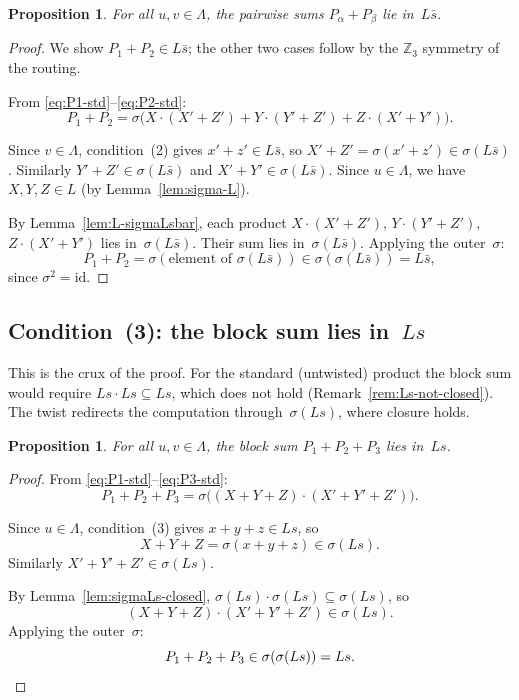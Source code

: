 \documentclass[twoside,english]{paper}
\numberwithin{equation}{section}
\numberwithin{figure}{section}
\newtheorem{proposition}[theorem]{Proposition}
\theoremstyle{definition}
\theoremstyle{remark}
\newcommand{\ZZ}{\mathbb{Z}}
\newcommand{\LL}{\Lambda}             %
\begin{document}
\begin{proposition}\label{prop:cond2}
For all $u, v \in \LL$, the pairwise sums $P_\alpha + P_\beta$ lie
in~$L\bar{s}$.
\end{proposition}

\begin{proof}
We show $P_1 + P_2 \in L\bar{s}$; the other two cases follow by the
$\ZZ_3$ symmetry of the routing.

From \eqref{eq:P1-std}--\eqref{eq:P2-std}:
\[
  P_1 + P_2 = \sigma\bigl(X \cdot (X' + Z') + Y \cdot (Y' + Z')
    + Z \cdot (X' + Y')\bigr).
\]

Since $v \in \LL$, condition~(2) gives $x' + z' \in L\bar{s}$, so
$X' + Z' = \sigma(x' + z') \in \sigma(L\bar{s})$.  Similarly
$Y' + Z' \in \sigma(L\bar{s})$ and $X' + Y' \in \sigma(L\bar{s})$.
Since $u \in \LL$, we have $X, Y, Z \in L$ (by Lemma~\ref{lem:sigma-L}).

By Lemma~\ref{lem:L-sigmaLsbar}, each product $X \cdot (X'+Z')$, $Y \cdot (Y'+Z')$,
$Z \cdot (X'+Y')$ lies in~$\sigma(L\bar{s})$.  Their sum lies
in~$\sigma(L\bar{s})$.  Applying the outer~$\sigma$:
\[
  P_1 + P_2 = \sigma(\text{element of } \sigma(L\bar{s}))
  \in \sigma(\sigma(L\bar{s})) = L\bar{s},
\]
since $\sigma^2 = \mathrm{id}$.
\end{proof}

\subsection{Condition~(3): the block sum lies in~$Ls$}

This is the crux of the proof.  For the standard (untwisted) product
the block sum would require $Ls \cdot Ls \subseteq Ls$, which does
not hold (Remark~\ref{rem:Ls-not-closed}).  The twist redirects the
computation through~$\sigma(Ls)$, where closure holds.

\begin{proposition}\label{prop:cond3}
For all $u, v \in \LL$, the block sum $P_1 + P_2 + P_3$ lies in~$Ls$.
\end{proposition}

\begin{proof}
From \eqref{eq:P1-std}--\eqref{eq:P3-std}:
\[
  P_1 + P_2 + P_3 = \sigma\bigl((X+Y+Z) \cdot (X'+Y'+Z')\bigr).
\]

Since $u \in \LL$, condition~(3) gives $x + y + z \in Ls$, so
\[
  X + Y + Z = \sigma(x+y+z) \in \sigma(Ls).
\]
Similarly $X' + Y' + Z' \in \sigma(Ls)$.

By Lemma~\ref{lem:sigmaLs-closed}, $\sigma(Ls) \cdot \sigma(Ls) \subseteq \sigma(Ls)$, so
\[
  (X+Y+Z) \cdot (X'+Y'+Z') \in \sigma(Ls).
\]
Applying the outer~$\sigma$:
\[
  P_1 + P_2 + P_3 \in \sigma(\sigma(Ls)) = Ls. \qedhere
\]
\end{proof}
\end{document}
